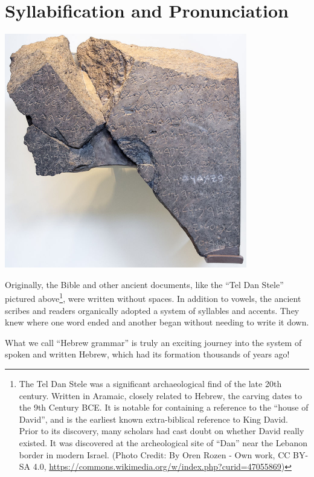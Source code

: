 \documentclass[
]{turabian-researchpaper}
\begin{document}
\hypertarget{Syllabification}{%
\section{Syllabification and Pronunciation}\label{Syllabification}}

\begin{quote}
\end{quote}

\begin{center}\includegraphics[width=300pt]{images/03.tel-dan} \end{center}

Originally, the Bible and other ancient documents, like the ``Tel Dan Stele'' pictured above\footnote{The Tel Dan Stele was a significant archaeological find of the late 20th century. Written in Aramaic, closely related to Hebrew, the carving dates to the 9th Century BCE. It is notable for containing a reference to the ``house of David'', and is the earliest known extra-biblical reference to King David. Prior to its discovery, many scholars had cast doubt on whether David really existed. It was discovered at the archeological site of ``Dan'' near the Lebanon border in modern Israel. (Photo Credit: By Oren Rozen - Own work, CC BY-SA 4.0, \url{https://commons.wikimedia.org/w/index.php?curid=47055869})}, were written without spaces. In addition to vowels, the ancient scribes and readers organically adopted a system of syllables and accents. They knew where one word ended and another began without needing to write it down.

What we call ``Hebrew grammar'' is truly an exciting journey into the system of spoken and written Hebrew, which had its formation thousands of years ago!
\end{document}

